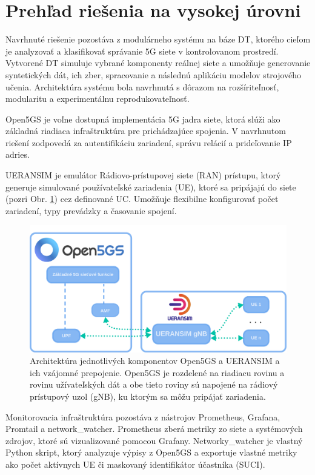 \section{Prehľad riešenia na vysokej úrovni}

Navrhnuté riešenie pozostáva z modulárneho systému na báze DT, ktorého cieľom je analyzovať a klasifikovať správanie 5G siete v kontrolovanom prostredí. Vytvorené DT simuluje vybrané komponenty reálnej siete a umožňuje generovanie syntetických dát, ich zber, spracovanie a následnú aplikáciu modelov strojového učenia. Architektúra systému bola navrhnutá s dôrazom na rozšíriteľnosť, modularitu a experimentálnu reprodukovateľnosť.

Open5GS je voľne dostupná implementácia 5G jadra siete, ktorá slúži ako základná riadiaca infraštruktúra pre prichádzajúce spojenia. V navrhnutom riešení zodpovedá za autentifikáciu zariadení, správu relácií a prideľovanie IP adries.

UERANSIM je emulátor Rádiovo-prístupovej siete (RAN) prístupu, ktorý generuje simulované používateľské zariadenia (UE), ktoré sa pripájajú do siete (pozri Obr. \ref{fig:architecture}) cez definované UC. Umožňuje flexibilne konfigurovať počet zariadení, typy prevádzky a časovanie spojení.

\begin{figure}[H]
    \centering
    \includegraphics[width=0.75\linewidth]{assets//images/core-uesk.png}
    \caption[Architektúra komponentov Open5GS a UERANSIM]{Architektúra jednotlivých komponentov Open5GS a UERANSIM a ich vzájomné prepojenie. Open5GS je rozdelené na riadiacu rovinu a rovinu užívateľských dát a obe tieto roviny sú napojené na rádiový prístupový uzol (gNB), ku ktorým sa môžu pripájať zariadenia.}
    \label{fig:architecture}
\end{figure}

Monitorovacia infraštruktúra pozostáva z nástrojov Prometheus, Grafana, Promtail a network\_watcher. Prometheus zberá metriky zo siete a systémových zdrojov, ktoré sú vizualizované pomocou Grafany. Networky\_watcher je vlastný Python skript, ktorý analyzuje výpisy z Open5GS a exportuje vlastné metriky ako počet aktívnych UE či maskovaný identifikátor účastníka (SUCI).


